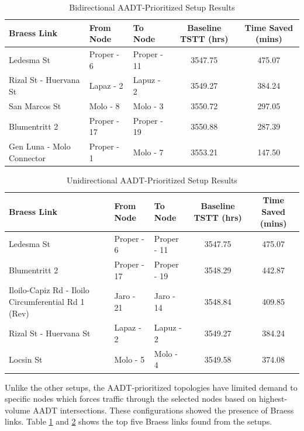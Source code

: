 \begin{table}[H]
    \centering
    \small 
    \setlength{\tabcolsep}{4pt} 
    \renewcommand{\thetable}{5.7}
    \begin{tabular}{|p{4.2cm}|l|l|c|c|}
    \hline
    \textbf{Braess Link} & \textbf{From Node} & \textbf{To Node} & \textbf{\parbox{2cm}{\centering Baseline TSTT (hrs)}} & \textbf{\parbox{2cm}{\centering Time Saved (mins)}} \\ \hline
    Ledesma St & Proper - 6 & Proper - 11 & 3547.75 & 475.07 \\ \hline
    Rizal St - Huervana St & Lapaz - 2 & Lapuz - 2 & 3549.27 & 384.24 \\ \hline
    San Marcos St & Molo - 8 & Molo - 3 & 3550.72 & 297.05 \\ \hline
    Blumentritt 2 & Proper - 17 & Proper - 19 & 3550.88 & 287.39 \\ \hline
    Gen Luna - Molo Connector & Proper - 1 & Molo - 7 & 3553.21 & 147.50 \\ \hline
    \end{tabular}
    \caption{Bidirectional AADT-Prioritized Setup Results}
    \label{tab:5.7}
\end{table}

\begin{table}[H]
    \centering
    \small
    \setlength{\tabcolsep}{4pt}
    \renewcommand{\thetable}{5.8}
    \begin{tabular}{|p{5.2cm}|l|l|c|c|}
    \hline
    \textbf{Braess Link} & \textbf{From Node} & \textbf{To Node} & \textbf{\parbox{2cm}{\centering Baseline TSTT (hrs)}} & \textbf{\parbox{2cm}{\centering Time Saved (mins)}} \\ \hline
    Ledesma St & Proper - 6 & Proper - 11 & 3547.75 & 475.07 \\ \hline
    Blumentritt 2 & Proper - 17 & Proper - 19 & 3548.29 & 442.87 \\ \hline
    Iloilo-Capiz Rd - Iloilo Circumferential Rd 1 (Rev) & Jaro - 21 & Jaro - 14 & 3548.84 & 409.85 \\ \hline
    Rizal St - Huervana St & Lapaz - 2 & Lapuz - 2 & 3549.27 & 384.24 \\ \hline
    Locsin St & Molo - 5 & Molo - 4 & 3549.58 & 374.08 \\ \hline
    \end{tabular}
    \caption{Unidirectional AADT-Prioritized Setup Results}
    \label{tab:5.8}
\end{table}

Unlike the other setups, the AADT-prioritized topologies have limited demand to specific nodes which forces traffic through the selected nodes based on highest-volume AADT intersections. These configurations showed the presence of Braess links. Table \ref{tab:5.7} and \ref{tab:5.8} shows the top five Braess links found from the setups.

